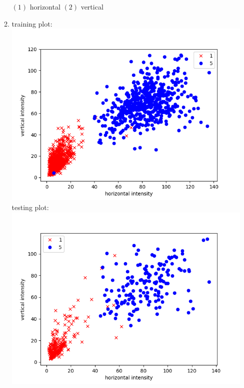 \documentclass{article}
\begin{document}
\begin{enumerate}
\begin{enumerate}[label=(\alph*)]
            $(1)$ horizontal
            $(2)$ vertical

            \item training plot: \\ \includegraphics[scale=0.5]{images/handwriting_train.png}\\
            testing plot: \\ \includegraphics[scale=0.5]{images/handwriting_test.png}
        \end{enumerate}
    \end{enumerate}
\end{document}
